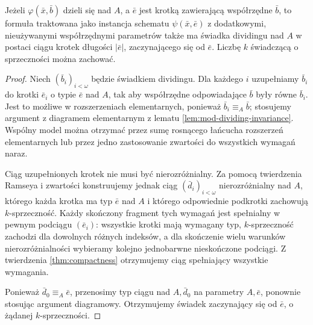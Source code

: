 \begin{lemat}
\label{lem:mod-dividing-padding}
Jeżeli $\varphi(\bar x,\bar b)$ dzieli się nad $A$,
a $\bar e$ jest krotką zawierającą współrzędne
$\bar b$, to formuła traktowana jako instancja
schematu $\psi(\bar x,\bar e)$ z dodatkowymi,
nieużywanymi współrzędnymi parametrów także ma
świadka dividingu nad $A$ w postaci ciągu
krotek długości $|\bar e|$, zaczynającego się
od $\bar e$. Liczbę $k$ świadczącą
o sprzeczności można zachować.
\end{lemat}
\begin{proof}
Niech $(\bar b_i)_{i<\omega}$ będzie
świadkiem dividingu. Dla każdego $i$
uzupełniamy $\bar b_i$ do krotki $\bar e_i$
o typie $\bar e$ nad $A$, tak aby
współrzędne odpowiadające $\bar b$
były równe $\bar b_i$.
Jest to możliwe w rozszerzeniach elementarnych,
ponieważ $\bar b_i\equiv_A\bar b$;
stosujemy argument z diagramem elementarnym
z lematu \ref{lem:mod-dividing-invariance}.
Wspólny model można otrzymać przez sumę
rosnącego łańcucha rozszerzeń elementarnych
lub przez jedno zastosowanie zwartości
do wszystkich wymagań naraz.

Ciąg uzupełnionych krotek nie musi być
nierozróżnialny. Za pomocą twierdzenia
Ramseya i zwartości konstruujemy jednak
ciąg $(\bar d_i)_{i<\omega}$ nierozróżnialny
nad $A$, którego każda krotka ma typ
$\bar e$ nad $A$ i którego odpowiednie
podkrotki zachowują $k$-sprzeczność.
Każdy skończony fragment tych wymagań
jest spełnialny w pewnym podciągu
$(\bar e_i)$: wszystkie krotki mają
wymagany typ, $k$-sprzeczność zachodzi
dla dowolnych różnych indeksów,
a dla skończenie wielu warunków
nierozróżnialności wybieramy kolejno
jednobarwne nieskończone podciągi.
Z twierdzenia \ref{thm:compactness}
otrzymujemy ciąg spełniający wszystkie
wymagania.

Ponieważ $\bar d_0\equiv_A\bar e$,
przenosimy typ ciągu nad $A,\bar d_0$
na parametry $A,\bar e$, ponownie
stosując argument diagramowy.
Otrzymujemy świadek zaczynający się
od $\bar e$, o żądanej $k$-sprzeczności.
\end{proof}


